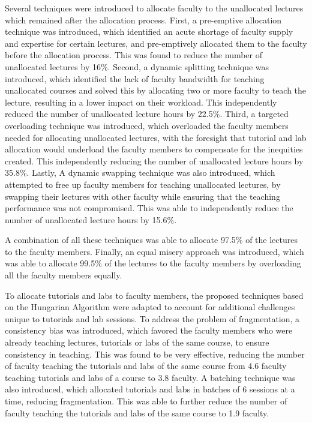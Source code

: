 Several techniques were introduced to allocate faculty to the unallocated lectures which remained after the allocation process. First, a pre-emptive allocation technique was introduced, which identified an acute shortage of faculty supply and expertise for certain lectures, and pre-emptively allocated them to the faculty before the allocation process. This was found to reduce the number of unallocated lectures by 16\%. Second, a dynamic splitting technique was introduced, which identified the lack of faculty bandwidth for teaching unallocated courses and solved this by allocating two or more faculty to teach the lecture, resulting in a lower impact on their workload. This independently reduced the number of unallocated lecture hours by 22.5\%. Third, a targeted overloading technique was introduced, which overloaded the faculty members needed for allocating unallocated lectures, with the foresight that tutorial and lab allocation would underload the faculty members to compensate for the inequities created. This independently reducing the number of unallocated lecture hours by 35.8\%. Lastly, A dynamic swapping technique was also introduced, which attempted to free up faculty members for teaching unallocated lectures, by swapping their lectures with other faculty while ensuring that the teaching performance was not compromised. This was able to independently reduce the number of unallocated lecture hours by 15.6\%.

A combination of all these techniques was able to allocate 97.5\% of the lectures to the faculty members. Finally, an equal misery approach was introduced, which was able to allocate 99.5\% of the lectures to the faculty members by overloading all the faculty members equally.

To allocate tutorials and labs to faculty members, the proposed techniques based on the Hungarian Algorithm were adapted to account for additional challenges unique to tutorials and lab sessions. To address the problem of fragmentation, a consistency bias was introduced, which favored the faculty members who were already teaching lectures, tutorials or labs of the same course, to ensure consistency in teaching. This was found to be very effective, reducing the number of faculty teaching the tutorials and labs of the same course from 4.6 faculty teaching tutorials and labs of a course to 3.8 faculty. A batching technique was also introduced, which allocated tutorials and labs in batches of 6 sessions at a time, reducing fragmentation. This was able to further reduce the number of faculty teaching the tutorials and labs of the same course to 1.9 faculty.

